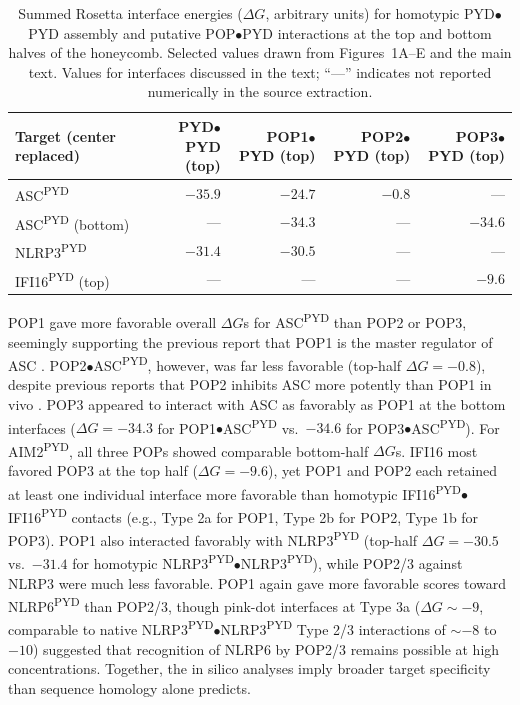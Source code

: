 \documentclass[11pt]{article}
\begin{document}
\begin{table}[ht]
\centering
\small
\caption{Summed Rosetta interface energies ($\Delta G$, arbitrary units) for homotypic PYD$\bullet$PYD assembly and putative POP$\bullet$PYD interactions at the top and bottom halves of the honeycomb. Selected values drawn from Figures~1A--E and the main text. Values for interfaces discussed in the text; ``---'' indicates not reported numerically in the source extraction.}
\label{tab:rosetta}
\begin{tabular}{lrrrr}
\toprule
Target (center replaced) & PYD$\bullet$PYD (top) & POP1$\bullet$PYD (top) & POP2$\bullet$PYD (top) & POP3$\bullet$PYD (top) \\
\midrule
ASC\textsuperscript{PYD}   & $-35.9$ & $-24.7$ & $-0.8$ & --- \\
ASC\textsuperscript{PYD} (bottom) & ---  & $-34.3$ & ---    & $-34.6$ \\
NLRP3\textsuperscript{PYD} & $-31.4$ & $-30.5$ & ---     & --- \\
IFI16\textsuperscript{PYD} (top) & ---  & ---     & ---     & $-9.6$ \\
\bottomrule
\end{tabular}
\end{table}

POP1 gave more favorable overall $\Delta G$s for ASC\textsuperscript{PYD} than POP2 or POP3, seemingly supporting the previous report that POP1 is the master regulator of ASC \citep{dealmeida2015}. POP2$\bullet$ASC\textsuperscript{PYD}, however, was far less favorable (top-half $\Delta G=-0.8$), despite previous reports that POP2 inhibits ASC more potently than POP1 in vivo \citep{ratsimandresy2017}. POP3 appeared to interact with ASC as favorably as POP1 at the bottom interfaces ($\Delta G=-34.3$ for POP1$\bullet$ASC\textsuperscript{PYD} vs.\ $-34.6$ for POP3$\bullet$ASC\textsuperscript{PYD}). For AIM2\textsuperscript{PYD}, all three POPs showed comparable bottom-half $\Delta G$s. IFI16 most favored POP3 at the top half ($\Delta G=-9.6$), yet POP1 and POP2 each retained at least one individual interface more favorable than homotypic IFI16\textsuperscript{PYD}$\bullet$IFI16\textsuperscript{PYD} contacts (e.g., Type 2a for POP1, Type 2b for POP2, Type 1b for POP3). POP1 also interacted favorably with NLRP3\textsuperscript{PYD} (top-half $\Delta G=-30.5$ vs.\ $-31.4$ for homotypic NLRP3\textsuperscript{PYD}$\bullet$NLRP3\textsuperscript{PYD}), while POP2/3 against NLRP3 were much less favorable. POP1 again gave more favorable scores toward NLRP6\textsuperscript{PYD} than POP2/3, though pink-dot interfaces at Type 3a ($\Delta G \sim -9$, comparable to native NLRP3\textsuperscript{PYD}$\bullet$NLRP3\textsuperscript{PYD} Type 2/3 interactions of $\sim -8$ to $-10$) suggested that recognition of NLRP6 by POP2/3 remains possible at high concentrations. Together, the in silico analyses imply broader target specificity than sequence homology alone predicts.
\end{document}
